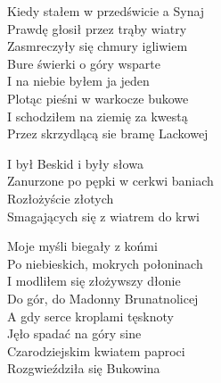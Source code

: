 
\begin{text}
    Kiedy stałem w przedświcie a Synaj\\
    Prawdę głosił przez trąby wiatry\\
    Zasmreczyły się chmury igliwiem\\
    Bure świerki o góry wsparte\\
    I na niebie byłem ja jeden\\
    Plotąc pieśni w warkocze bukowe\\
    I schodziłem na ziemię za kwestą\\
    Przez skrzydlącą sie bramę Lackowej

    \vin I był Beskid i były słowa\\
    \vin Zanurzone po pępki w cerkwi baniach\\
    \vin Rozłożyście złotych\\
    \vin Smagających się z wiatrem do krwi

    Moje myśli biegały z końmi\\
    Po niebieskich, mokrych połoninach\\
    I modliłem się złożywszy dłonie\\
    Do gór, do Madonny Brunatnolicej\\
    A gdy serce kroplami tęsknoty\\
    Jęło spadać na góry sine\\
    Czarodziejskim kwiatem paproci\\
    Rozgwieździła się Bukowina
\end{text}
\begin{chord}

\end{chord}